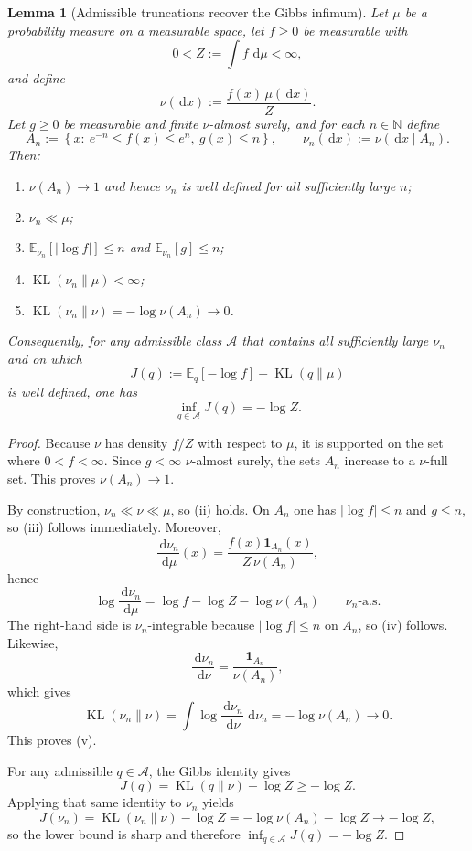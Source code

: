 \documentclass[11pt]{article}
\newcommand{\E}{\mathbb{E}}
\newcommand{\KL}{\operatorname{KL}}
\newcommand{\dd}{\,\mathrm d}
\newcommand{\abs}[1]{\left\lvert #1 \right\rvert}
\newcommand{\set}[1]{\left\{ #1 \right\}}
\newcommand{\bracks}[1]{\left[ #1 \right]}
\newcommand{\ind}{\mathbf{1}}
\newcommand{\mc}{\mathcal}
\numberwithin{equation}{section}
\theoremstyle{plain}
\newtheorem{lemma}[theorem]{Lemma}
\theoremstyle{definition}
\theoremstyle{remark}
\begin{document}
\begin{lemma}[Admissible truncations recover the Gibbs infimum]
\label{lem:admissible-truncation}
Let $\mu$ be a probability measure on a measurable space, let $f\ge 0$ be measurable with
\[
0<Z:=\int f\,\dd\mu<\infty,
\]
and define
\[
\nu(\dd x):=\frac{f(x)\,\mu(\dd x)}{Z}.
\]
Let $g\ge 0$ be measurable and finite $\nu$-almost surely, and for each $n\in\mathbb N$ define
\[
A_n:=\set{x:\ e^{-n}\le f(x)\le e^n,\ g(x)\le n},
\qquad
\nu_n(\dd x):=\nu(\dd x\mid A_n).
\]
Then:
\begin{enumerate}[label=\roman*.]
\item $\nu(A_n)\to 1$ and hence $\nu_n$ is well defined for all sufficiently large $n$;
\item $\nu_n\ll\mu$;
\item $\E_{\nu_n}\!\bracks{\abs{\log f}}\le n$ and $\E_{\nu_n}[g]\le n$;
\item $\KL(\nu_n\|\mu)<\infty$;
\item $\KL(\nu_n\|\nu)=-\log \nu(A_n)\to 0$.
\end{enumerate}
Consequently, for any admissible class $\mc A$ that contains all sufficiently large $\nu_n$ and on which
\[
J(q):=\E_q[-\log f]+\KL(q\|\mu)
\]
is well defined, one has
\[
\inf_{q\in\mc A}J(q)=-\log Z.
\]
\end{lemma}

\begin{proof}
Because $\nu$ has density $f/Z$ with respect to $\mu$, it is supported on the set where $0<f<\infty$. Since $g<\infty$ $\nu$-almost surely, the sets $A_n$ increase to a $\nu$-full set. This proves $\nu(A_n)\to 1$.

By construction, $\nu_n\ll\nu\ll\mu$, so \textup{(ii)} holds. On $A_n$ one has $\abs{\log f}\le n$ and $g\le n$, so \textup{(iii)} follows immediately. Moreover,
\[
\frac{\dd \nu_n}{\dd \mu}(x)
=
\frac{f(x)\ind_{A_n}(x)}{Z\,\nu(A_n)},
\]
hence
\[
\log\frac{\dd \nu_n}{\dd \mu}
=
\log f-\log Z-\log \nu(A_n)
\qquad
\nu_n\text{-a.s.}
\]
The right-hand side is $\nu_n$-integrable because $\abs{\log f}\le n$ on $A_n$, so \textup{(iv)} follows. Likewise,
\[
\frac{\dd \nu_n}{\dd \nu}
=
\frac{\ind_{A_n}}{\nu(A_n)},
\]
which gives
\[
\KL(\nu_n\|\nu)
=
\int \log\frac{\dd \nu_n}{\dd \nu}\,\dd \nu_n
=
-\log \nu(A_n)\to 0.
\]
This proves \textup{(v)}.

For any admissible $q\in\mc A$, the Gibbs identity gives
\[
J(q)=\KL(q\|\nu)-\log Z\ge -\log Z.
\]
Applying that same identity to $\nu_n$ yields
\[
J(\nu_n)=\KL(\nu_n\|\nu)-\log Z=-\log \nu(A_n)-\log Z\to -\log Z,
\]
so the lower bound is sharp and therefore $\inf_{q\in\mc A}J(q)=-\log Z$.
\end{proof}
\end{document}
